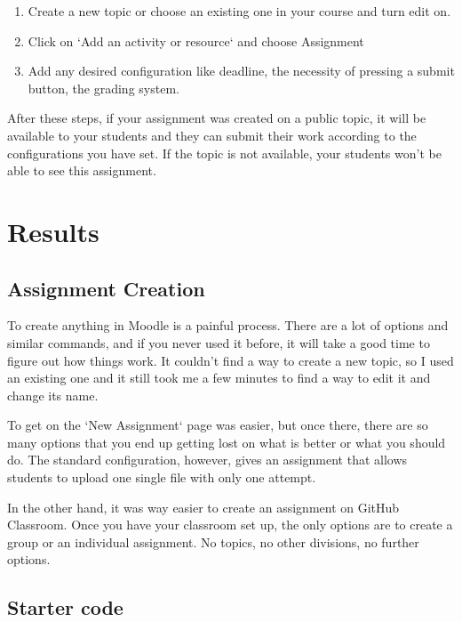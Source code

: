 \documentclass[12pt]{article}
\begin{document}
\begin{enumerate}

\item Create a new topic or choose an existing one in your course and turn edit on.

\item Click on `Add an activity or resource` and choose Assignment

\item Add any desired configuration like deadline, the necessity of pressing a submit button, the grading system. 

\end{enumerate}

After these steps, if your assignment was created on a public topic, it will be available to your students and they can submit their work according to the configurations you have set. If the topic is not available, your students won't be able to see this assignment.


\section{Results}

\subsection{Assignment Creation}

To create anything in Moodle is a painful process. There are a lot of options and similar commands, and if you never used it before, it will take a good time to figure out how things work. It couldn't find a way to create a new topic, so I used an existing one and it still took me a few minutes to find a way to edit it and change its name.

To get on the `New Assignment` page was easier, but once there, there are so many options that you end up getting lost on what is better or what you should do. The standard configuration, however, gives an assignment that allows students to upload one single file with only one attempt.

In the other hand, it was way easier to create an assignment on GitHub Classroom. Once you have your classroom set up, the only options are to create a group or an individual assignment. No topics, no other divisions, no further options.

\subsection{Starter code}
\end{document}
